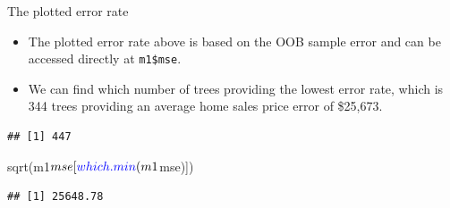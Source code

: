 \documentclass[
  10pt,
  ignorenonframetext,
]{beamer}
\newenvironment{Shaded}{}{}
\newcommand{\KeywordTok}[1]{\textcolor[rgb]{0.00,0.00,1.00}{#1}}
\newcommand{\NormalTok}[1]{#1}
\newcommand{\OperatorTok}[1]{#1}
\providecommand{\tightlist}{%
  \setlength{\itemsep}{0pt}\setlength{\parskip}{0pt}}
\begin{document}
\begin{frame}[fragile]{The plotted error rate}
\protect\hypertarget{the-plotted-error-rate}{}

\begin{itemize}
\tightlist
\item
  The plotted error rate above is based on the OOB sample error and can
  be accessed directly at \texttt{m1\$mse}.
\item
  We can find which number of trees providing the lowest error rate,
  which is 344 trees providing an average home sales price error of
  \$25,673.
\end{itemize}

\begin{Shaded}
\end{Shaded}

\begin{verbatim}
## [1] 447
\end{verbatim}

\begin{Shaded}
\begin{Highlighting}[]
\KeywordTok{sqrt}\NormalTok{(m1}\OperatorTok{$}\NormalTok{mse[}\KeywordTok{which.min}\NormalTok{(m1}\OperatorTok{$}\NormalTok{mse)])}
\end{Highlighting}
\end{Shaded}

\begin{verbatim}
## [1] 25648.78
\end{verbatim}

\end{frame}
\end{document}
